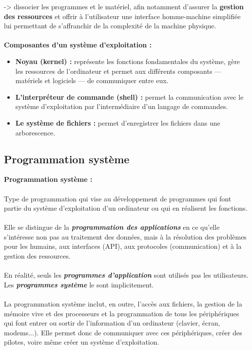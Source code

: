 		\begin{frame}
			-> dissocier les programmes et le matériel, afin notamment d'assurer la \textbf{gestion des ressources} et offrir à l'utilisateur une interface homme-machine simplifiée lui permettant de s'affranchir de la complexité de la machine physique.
			\\~\\
			\textbf{Composantes d'un système d'exploitation :}~\\
				\begin {itemize}
					\item \textbf{Noyau (kernel) :} représente les fonctions fondamentales du système, gère les ressources de l’ordinateur et permet aux différents composants — matériels et logiciels — de communiquer entre eux.
					\item \textbf{L'interpréteur de commande (shell) :} permet la communication avec le système d'exploitation par l'intermédiaire d'un langage de commandes.
					\item \textbf{Le système de fichiers :} permet d'enregistrer les fichiers dans une arborescence.
				\end{itemize}
		\end{frame}
	
	\subsection{Programmation système}
		\begin{frame}
			\textbf{Programmation système :}
			\\~\\
			Type de programmation qui vise au développement de programmes qui font partie du système d’exploitation d’un ordinateur ou qui en réalisent les fonctions.\\~\\
			
			Elle se distingue de la \textit{\textbf{programmation des applications}} en ce qu’elle s’intéresse non pas au traitement des données, mais à la résolution des problèmes pour les humains, aux interfaces (API), aux protocoles (communication) et à la gestion des ressources.\\~\\
			
			En réalité, seuls les \textit{\textbf{programmes d'application}} sont utilisés pas les utilisateurs. Les \textit{\textbf{programmes système}} le sont implicitement.\\~\\
			
			La programmation système inclut, en outre, l’accès aux fichiers, la gestion de la mémoire vive et des processeurs et la programmation de tous les périphériques qui font entrer ou sortir de l’information d’un ordinateur (clavier, écran, modems...). Elle permet donc de communiquer avec ces périphériques, créer des pilotes, voire même créer un système d'exploitation.
			
		\end{frame}
		
